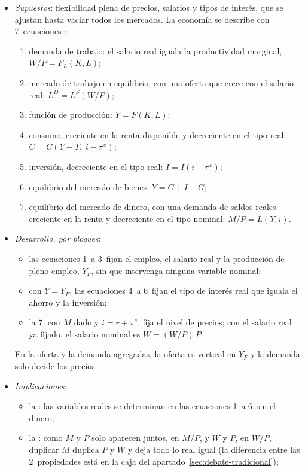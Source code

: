 \documentclass[11pt]{article}
\begin{document}
\begin{itemize}
\item \emph{Supuestos}: flexibilidad plena de precios, salarios y tipos de interés, que se ajustan hasta vaciar todos los mercados. La economía se describe con 7~ecuaciones\nocite{Serletis2007Demand} :
  \begin{enumerate}
  \item demanda de trabajo: el salario real iguala la productividad marginal, $W/P=F_L(K,L)$;
  \item mercado de trabajo en equilibrio, con una oferta que crece con el salario real: $L^D=L^S(W/P)$;
  \item función de producción: $Y=F(K,L)$;
  \item consumo, creciente en la renta disponible y decreciente en el tipo real: $C=C(Y-T,\;i-\pi^e)$;
  \item inversión, decreciente en el tipo real: $I=I(i-\pi^e)$;
  \item equilibrio del mercado de bienes: $Y=C+I+G$;
  \item equilibrio del mercado de dinero, con una demanda de saldos reales creciente en la renta y decreciente en el tipo nominal: $M/P=L(Y,i)$.
  \end{enumerate}
\item \emph{Desarrollo, por bloques}:
  \begin{itemize}
  \item las ecuaciones 1~a 3~fijan el empleo, el salario real y la producción de pleno empleo, $Y_F$, sin que intervenga ninguna variable nominal;
  \item con $Y=Y_F$, las ecuaciones 4~a 6~fijan el tipo de interés real que iguala el ahorro y la inversión;
  \item la 7, con $M$ dado y $i=r+\pi^e$, fija el nivel de precios; con el salario real ya fijado, el salario nominal es $W=(W/P)\,P$.
  \end{itemize}
  En la oferta y la demanda agregadas, la oferta es vertical en $Y_F$ y la demanda solo decide los precios.
\item \emph{Implicaciones}:
  \begin{itemize}
  \item la : las variables reales se determinan en las ecuaciones 1~a 6~sin el dinero;
  \item la : como $M$ y $P$ solo aparecen juntos, en $M/P$, y $W$ y $P$, en $W/P$, duplicar $M$ duplica $P$ y $W$ y deja todo lo real igual (la diferencia entre las 2~propiedades está en la caja del apartado~\ref{sec:debate-tradicional});

\end{itemize}
\end{itemize}
\end{document}
